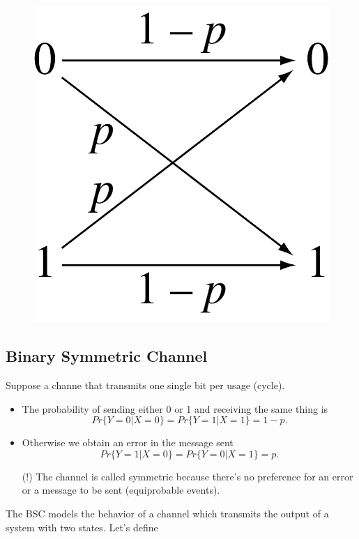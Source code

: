 \documentclass[11pt]{amsart}
\begin{document}
\begin{figure}[h]
\includegraphics[scale=.1]{Binary_symmetric_channel}
\end{figure}

\subsection{Binary Symmetric Channel}
Suppose a channe that transmits one single bit per usage (cycle).

\begin{itemize}
\item The probability of sending either 0 or 1 and receiving the same thing is
$$Pr\{Y = 0 | X = 0\} = Pr\{Y = 1 | X = 1\} = 1- p.$$

\item Otherwise we obtain an error in the message sent
$$Pr\{Y = 1 | X = 0\} = Pr\{Y = 0 | X = 1\} = p.$$

\item[(!)] The channel is called symmetric because there's no preference for an error or a message to be sent (equiprobable events).
\end{itemize}

The BSC models the behavior of a channel which transmits the output of a system with two states. Let's define
\end{document}
